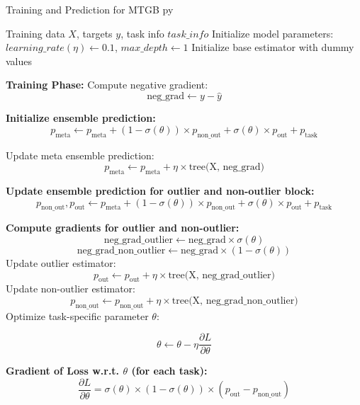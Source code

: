 \documentclass{article}
\begin{document}
\begin{algorithm}
    \caption{Training and Prediction for MTGB py}
    \begin{algorithmic}[1]
        \REQUIRE Training data $X$, targets $y$, task info $task\_info$
        \STATE Initialize model parameters:
        \STATE  $learning\_rate (\eta) \gets 0.1$, $max\_depth \gets 1$
        \STATE Initialize base estimator with dummy values

        \STATE \textbf{Training Phase:}
        \STATE Compute negative gradient:
        \[
            \text{neg\_grad} \gets y - \hat{y}
        \]

        \STATE \textbf{Initialize ensemble prediction:}
        \[
            p_{\text{meta}} \gets p_{\text{meta}} + (1 - \sigma(\theta)) \times p_{\text{non\_out}} + \sigma(\theta) \times p_{\text{out}} + p_{\text{task}}
        \]

        \STATE Update meta ensemble prediction:
        \[
            p_{\text{meta}} \gets p_{\text{meta}} + \eta \times \text{tree(X, neg\_grad)}
        \]


        \STATE \textbf{Update ensemble prediction for outlier and non-outlier block:}
        \[
            p_{\text{non\_out}}, p_{\text{out}} \gets p_{\text{meta}} + (1 - \sigma(\theta)) \times p_{\text{non\_out}} + \sigma(\theta) \times p_{\text{out}} + p_{\text{task}}
        \]


        \STATE \textbf{Compute gradients for outlier and non-outlier:}
        \[
            \text{neg\_grad\_outlier} \gets \text{neg\_grad} \times \sigma(\theta)
        \]
        \[
            \text{neg\_grad\_non\_outlier} \gets \text{neg\_grad} \times (1 - \sigma(\theta))
        \]
        \STATE Update outlier estimator:
        \[
            p_{\text{out}} \gets p_{\text{out}} + \eta \times \text{tree(X, neg\_grad\_outlier)}
        \]
        \STATE Update non-outlier estimator:
        \[
            p_{\text{non\_out}} \gets p_{\text{non\_out}} + \eta \times \text{tree(X, neg\_grad\_non\_outlier)}
        \]
        \STATE Optimize task-specific parameter $\theta$:

        \[
            \theta \gets \theta - \eta \frac{\partial L}{\partial \theta}
        \]

        \STATE \textbf{Gradient of Loss w.r.t. $\theta$ (for each task):}
        \[
            \frac{\partial L}{\partial \theta} = \sigma(\theta) \times (1 - \sigma(\theta)) \times \left( p_{\text{out}} - p_{\text{non\_out}} \right)
        \]


\end{algorithmic}
\end{algorithm}
\end{document}

